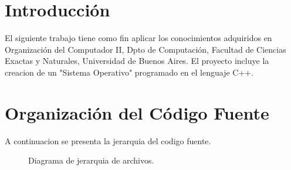 \documentclass[a4paper,10pt]{article}
\begin{document}
\tableofcontents

\newpage


\section*{Introducci\'on}
El siguiente trabajo tiene como fin aplicar los conocimientos adquiridos en Organización del Computador II, Dpto de Computación, Facultad de Ciencias Exactas y Naturales, Universidad de Buenos Aires.	El proyecto incluye la creacion de un "Sistema Operativo" programado en el lenguaje C++.



\section*{Organizaci\'on del C\'odigo Fuente}
A continuacion se presenta la jerarquia del codigo fuente.

\begin{figure}[H]
\centering
{}
\caption{Diagrama de jerarquia de archivos.}
\end{figure}
\end{document}
